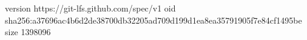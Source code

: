 version https://git-lfs.github.com/spec/v1
oid sha256:a37696ac4b6d2de38700db32205ad709d199d1ea8ea35791905f7e84cf1495be
size 1398096
